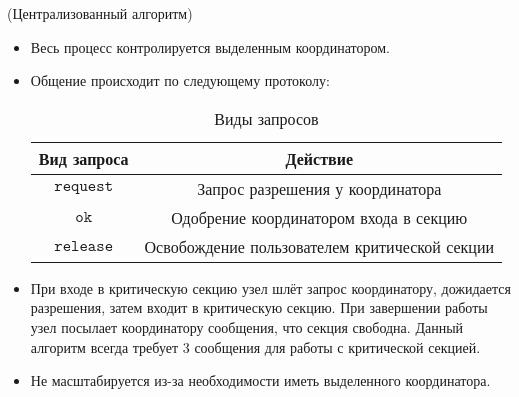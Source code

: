\begin{algorithm}(Централизованный алгоритм)
    \begin{itemize}
        \item Весь процесс контролируется выделенным координатором.
        \item Общение происходит по следующему протоколу:
            \begin{table}[!ht]
                \centering
                \begin{tabular}{|c|c|} \hline
                    Вид запроса & Действие \\ \hline
                    $\texttt{request}$ & Запрос разрешения у координатора \\ \hline
                    $\texttt{ok}$ & Одобрение координатором входа в секцию \\ \hline
                    $\texttt{release}$ & Освобождение пользователем критической 
                    секции \\ \hline
                \end{tabular}
                \caption{Виды запросов}
            \end{table}
        \item При входе в критическую секцию узел шлёт запрос координатору, 
            дожидается разрешения, затем входит в критическую секцию.
            При завершении работы узел посылает координатору сообщения, 
            что секция свободна. Данный алгоритм всегда требует 3 сообщения для 
            работы с критической секцией.
        \item Не масштабируется из-за необходимости иметь выделенного координатора.
    \end{itemize}
\end{algorithm}

